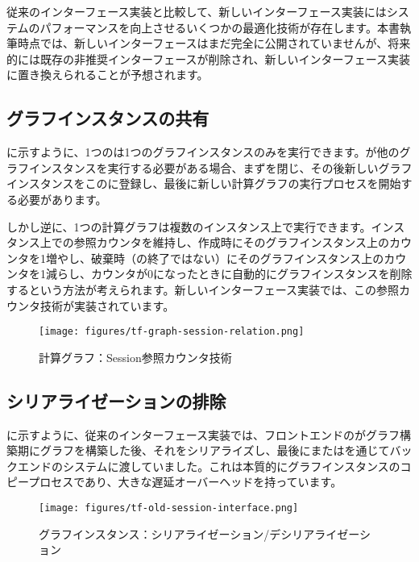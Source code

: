 \begin{content}

従来のインターフェース実装と比較して、新しいインターフェース実装にはシステムのパフォーマンスを向上させるいくつかの最適化技術が存在します。本書執筆時点では、新しいインターフェースはまだ完全に公開されていませんが、将来的には既存の非推奨インターフェースが削除され、新しいインターフェース実装に置き換えられることが予想されます。

\subsection{グラフインスタンスの共有}

に示すように、1つのは1つのグラフインスタンスのみを実行できます。が他のグラフインスタンスを実行する必要がある場合、まずを閉じ、その後新しいグラフインスタンスをこのに登録し、最後に新しい計算グラフの実行プロセスを開始する必要があります。

しかし逆に、1つの計算グラフは複数のインスタンス上で実行できます。インスタンス上での参照カウンタを維持し、作成時にそのグラフインスタンス上のカウンタを1増やし、破棄時（の終了ではない）にそのグラフインスタンス上のカウンタを1減らし、カウンタが0になったときに自動的にグラフインスタンスを削除するという方法が考えられます。新しいインターフェース実装では、この参照カウンタ技術が実装されています。

\begin{figure}[H]
\centering
\texttt{[image: figures/tf-graph-session-relation.png]}
\caption{計算グラフ：Session参照カウンタ技術}
 \label{fig:tf-graph-session-relation}
\end{figure}

\subsection{シリアライゼーションの排除}

に示すように、従来のインターフェース実装では、フロントエンドのがグラフ構築期にグラフを構築した後、それをシリアライズし、最後にまたはを通じてバックエンドのシステムに渡していました。これは本質的にグラフインスタンスのコピープロセスであり、大きな遅延オーバーヘッドを持っています。

\begin{figure}[H]
\centering
\texttt{[image: figures/tf-old-session-interface.png]}
\caption{グラフインスタンス：シリアライゼーション/デシリアライゼーション}
 \label{fig:tf-old-session-interface}
\end{figure}


\end{content}
